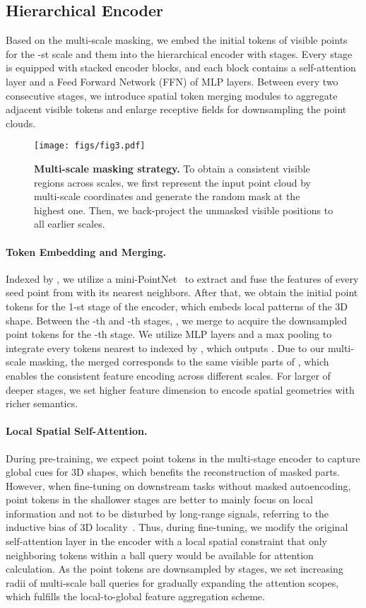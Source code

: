 \documentclass{article}
\begin{document}
\subsection{Hierarchical Encoder}
\label{hencoder}
Based on the multi-scale masking, we embed the initial tokens of visible points  for the -st scale and them into the hierarchical encoder with  stages. Every stage is equipped with  stacked encoder blocks, and each block contains a self-attention layer and a Feed Forward Network (FFN) of MLP layers. Between every two consecutive stages, we introduce spatial token merging modules to aggregate adjacent visible tokens and enlarge receptive fields for downsampling the point clouds.

\begin{figure*}[t!]
  \centering
    \texttt{[image: figs/fig3.pdf]}
    \vspace{0.1cm}
   \caption{\textbf{Multi-scale masking strategy.} To obtain a consistent visible regions across scales, we first represent the input point cloud by multi-scale coordinates and generate the random mask at the highest one. Then, we back-project the unmasked visible positions to all earlier scales.}
    \label{fig3}
\end{figure*}

\paragraph{Token Embedding and Merging.}
Indexed by , we utilize a mini-PointNet~\cite{qi2017pointnet} to extract and fuse the features of every seed point from  with its  nearest neighbors. After that, we obtain the initial point tokens  for the 1-st stage of the encoder, which embeds  local patterns of the 3D shape.
Between the -th and -th stages, , we merge  to acquire the downsampled point tokens for the -th stage. We utilize MLP layers and a max pooling to integrate every  tokens nearest to  indexed by , which outputs . 
Due to our multi-scale masking, the merged  corresponds to the same visible parts of , which enables the consistent feature encoding across different scales.
For larger  of deeper stages, we set higher feature dimension  to encode spatial geometries with richer semantics. 
\paragraph{Local Spatial Self-Attention.}
During pre-training, we expect point tokens in the multi-stage encoder to capture global cues for 3D shapes, which benefits the reconstruction of masked parts.
However, when fine-tuning on downstream tasks without masked autoencoding, point tokens in the shallower stages are better to mainly focus on local information and not to be disturbed by long-range signals, referring to the inductive bias of 3D locality~\cite{qi2017pointnet++}. Thus, during fine-tuning, we modify the original self-attention layer in the encoder with a local spatial constraint that only neighboring tokens within a ball query would be available for attention calculation. As the point tokens are downsampled by stages, we set increasing radii  of multi-scale ball queries for gradually expanding the attention scopes, which fulfills the local-to-global feature aggregation scheme.
\end{document}
